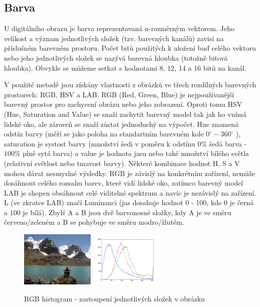 \documentclass[czech,BP]{thesiskiv}
\begin{document}
\subsection{Barva}
\par U digitálního obrazu je barva reprezentovaná n-rozměrným vektorem. Jeho velikost a význam jednotlivých složek (tzv. barevných kanálů) zavisí na příslušném barevném prostoru. Počet bitů použitých k uložení buď celého vektoru nebo jeho jednotlivých složek se nazývá barevná hloubka (totožně bitová hloubka). Obvykle se můžeme setkat s hodnotami 8, 12, 14 a 16 bitů na kanál. 
\\
\par V použité metodě jsou získány vlastnosti z obrázků ve třech rozdílných barevných prostorech: RGB, HSV a LAB. RGB (Red, Green, Blue) je nejpoužívanější barevný prostor pro zachycení obrázu nebo jeho zobrazení. Oproti tomu HSV (Hue, Saturation and Value) se snaží zachytit barevný model tak jak ho vnímá lidské oko, ale zároveň se snaží zůstat jednoduchý na výpočet. Hue znamená odstín barvy (měří se jako poloha na standartním barevném kole $0^{\circ} - 360^{\circ}$ ), saturation je systost barvy (množství šedi v poměru k odstínu $0 \%$ šedá barva - $100 \%$ plně sytá barva) a value je hodnota jasu nebo také množství bílého světla (relativní světlost nebo tmavost barvy). Některé kombinace hodnot H, S a V mohou dávat nesmyslné výsledky. RGB je závislý na konkrétním zařízení, nemůže dosáhnout celého rozsahu barev, které vidí lidské oko, zatímco barevný model LAB je shopen obsáhnout celé viditelné spektrum a navíc je nezávislý na zařízení. L (ve zkratce LAB) značí Luminanci (jas dosahuje hodnot 0 - 100, kde 0 je černá a 100 je bílá). Zbylé A a B jsou dvě barvonosné složky, kdy A je ve směru červeno/zeleném a B se pohybuje ve směru modro/žlutém.

\begin{figure}[H]
		\centering
		\includegraphics[height=100px]{./img/img_histogram.jpg}	
		\includegraphics[height=100px]{./img/bgr_histogram.png}	
		\caption{RGB histogram - zastoupení jednotlivých složek v obrázku}
\end{figure}
\end{document}
